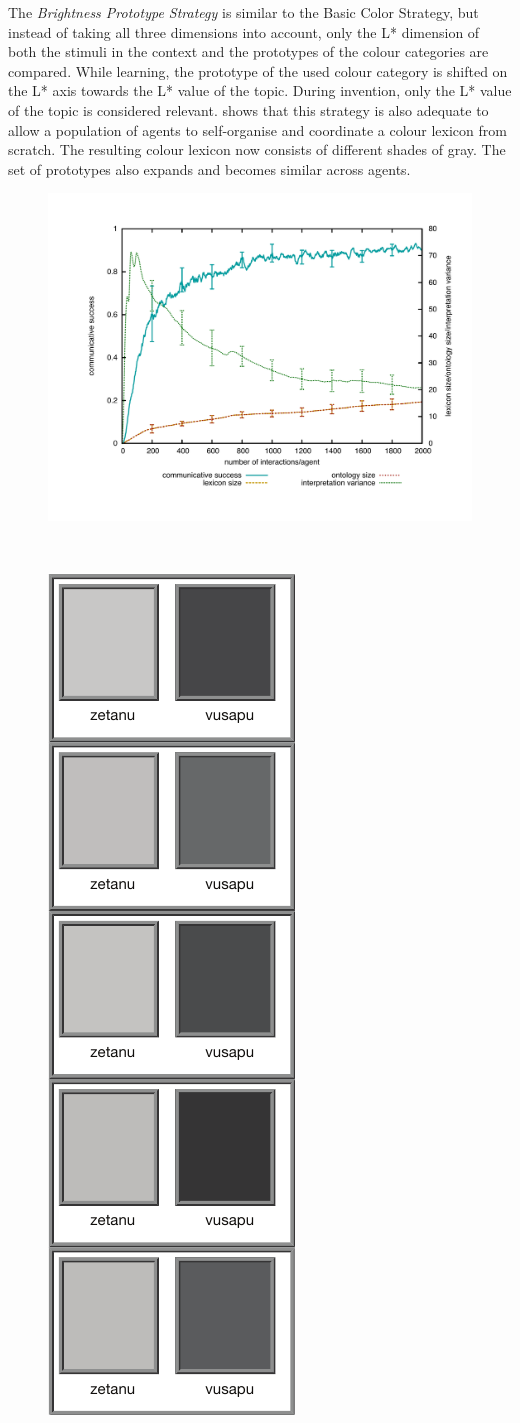 The {\itshape Brightness Prototype Strategy} is similar to the Basic Color Strategy, but instead of taking all three dimensions into account, only the L* dimension of both the stimuli in the context and the prototypes of the colour categories are compared. While learning, the prototype of the used colour category is shifted on the L* axis towards the L* value of the topic. During invention, only the L* value of the topic is considered relevant.  shows that this strategy is also adequate to allow a population of agents to self-organise and coordinate a colour lexicon from scratch. The resulting colour lexicon now consists of different shades of gray. The set of prototypes also expands and becomes similar across agents. 

\begin{figure}[p]
\centerline{
\includegraphics[width=\textwidth]{chap12/figs/brightness-graph.pdf}
}\\
\centerline{
\includegraphics[height=0.5\textwidth]{chap12/figs/bw-1000.pdf} $~~~$
}
\end{figure}
